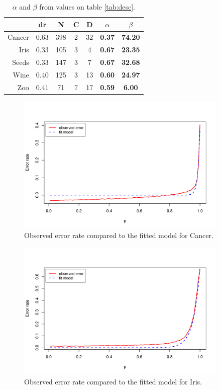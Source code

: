 \documentclass{article}
\begin{document}
\begin{table}[h]
 \centering
 \begin{tabular}{rcccccc}
  \toprule
	& dr	& N	& C	& D 	& \boldmath$\alpha$	& \boldmath$\beta$	\\
  \midrule
Cancer	& 0.63	& 398	& 2	& 32 	& \textbf{0.37}	& \textbf{74.20}	\\
Iris	& 0.33	& 105	& 3	& 4 	& \textbf{0.67}	& \textbf{23.35}	\\
Seeds	& 0.33	& 147	& 3	& 7 	& \textbf{0.67}	& \textbf{32.68}	\\
Wine	& 0.40	& 125	& 3	& 13 	& \textbf{0.60}	& \textbf{24.97}	\\
Zoo	& 0.41	& 71	& 7	& 17 	& \textbf{0.59}	& \textbf{6.00}	\\







  \bottomrule
 \end{tabular}
 \caption{$\alpha$ and $\beta$ from values on table \ref{tab:desc}.}\label{tab:extend}
\end{table}

\begin{figure}
 \centering
 \includegraphics[width=0.9\textwidth]{./figures/cancer.pdf}
 \caption{Observed error rate compared to the fitted model for Cancer.}
 \label{fig:cancer}
\end{figure}

\begin{figure}
 \centering
 \includegraphics[width=0.9\textwidth]{./figures/iris.pdf}
 \caption{Observed error rate compared to the fitted model for Iris.}
 \label{fig:iris}
\end{figure}
\end{document}
